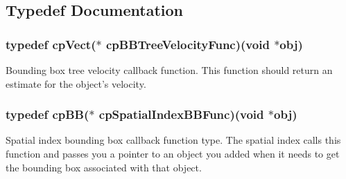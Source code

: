 \subsection{Typedef Documentation}
\hypertarget{group__cp_spatial_index_gaa256addb4f65c6846dfc306ef62a3988}{
\subsubsection[{cp\-B\-B\-Tree\-Velocity\-Func}]{\setlength{\rightskip}{0pt plus 5cm}typedef {\bf cp\-Vect}($\ast$ {\bf cp\-B\-B\-Tree\-Velocity\-Func})(void $\ast$obj)}}\label{group__cp_spatial_index_gaa256addb4f65c6846dfc306ef62a3988}
Bounding box tree velocity callback function. This function should return an estimate for the object's velocity. \hypertarget{group__cp_spatial_index_gafbecd34bd436d4a56200b7a542d94fc1}{
\subsubsection[{cp\-Spatial\-Index\-B\-B\-Func}]{\setlength{\rightskip}{0pt plus 5cm}typedef {\bf cp\-B\-B}($\ast$ {\bf cp\-Spatial\-Index\-B\-B\-Func})(void $\ast$obj)}}\label{group__cp_spatial_index_gafbecd34bd436d4a56200b7a542d94fc1}
Spatial index bounding box callback function type. The spatial index calls this function and passes you a pointer to an object you added when it needs to get the bounding box associated with that object. 

